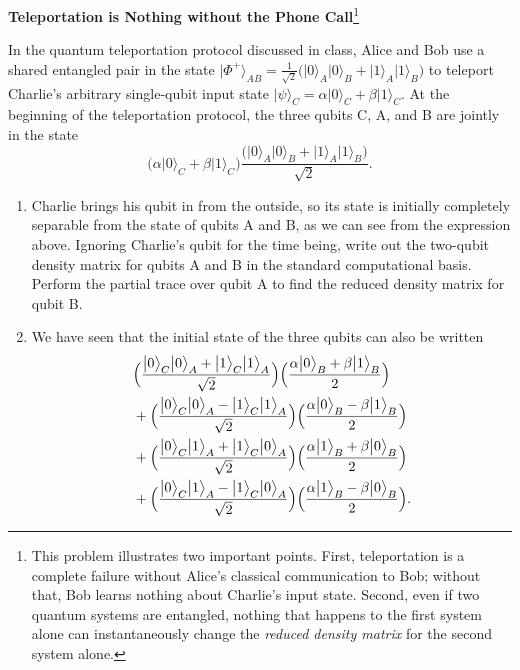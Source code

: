 \documentclass[10pt,letterpaper,boxed,cm]{hmcpset}
\newcommand{\ket}[1]{\big\lvert #1\big\rangle}
\begin{document}

\begin{problem}[1.]
    \textbf{Teleportation is Nothing without the Phone Call}\footnote{This problem illustrates two important points.  First, teleportation is a complete failure without Alice's classical communication to Bob; without that, Bob learns nothing about Charlie's input state.  Second, even if two quantum systems are entangled, nothing that happens to the first system alone can instantaneously change the \textit{reduced density matrix} for the second system alone.}

    In the quantum teleportation protocol discussed in class, Alice and Bob use a shared entangled pair in the state $\ket{\Phi^+}_{AB} = \frac{1}{\sqrt{2}}\bigl(\ket{0}_A\ket{0}_B + \ket{1}_A\ket{1}_B\bigr)$ to teleport Charlie's arbitrary single-qubit input state $\ket{\psi}_C = \alpha\ket{0}_C + \beta\ket{1}_C$.  At the beginning of the teleportation protocol, the three qubits C, A, and B are jointly in the state
    \[
        \bigl(\alpha\ket{0}_C+\beta\ket{1}_C\bigr)\frac{\bigl(\ket{0}_A\ket{0}_B+\ket{1}_A\ket{1}_B\bigr)}{\sqrt{2}}.
    \]
    \begin{enumerate}[label=(\alph*)]
        \item Charlie brings his qubit in from the outside, so its state is initially completely separable from the state of qubits A and B, as we can see from the expression above.  Ignoring Charlie's qubit for the time being, write out the two-qubit density matrix for qubits A and B in the standard computational basis.  Perform the partial trace over qubit A to find the reduced density matrix for qubit B.
        \item We have seen that the initial state of the three qubits can also be written
        \begin{align}
            &\Bigl(\frac{\ket{0}_C\ket{0}_A + \ket{1}_C\ket{1}_A}{\sqrt{2}}\Bigr) \Bigl(\frac{\alpha\ket{0}_B + \beta\ket{1}_B}{2}\Bigr) \nonumber \\
            &+ \Bigl(\frac{\ket{0}_C\ket{0}_A - \ket{1}_C\ket{1}_A}{\sqrt{2}}\Bigr) \Bigl(\frac{\alpha\ket{0}_B - \beta\ket{1}_B}{2}\Bigr) \nonumber \\
            &+ \Bigl(\frac{\ket{0}_C\ket{1}_A + \ket{1}_C\ket{0}_A}{\sqrt{2}}\Bigr) \Bigl(\frac{\alpha\ket{1}_B + \beta\ket{0}_B}{2}\Bigr) \nonumber \\
            &+ \Bigl(\frac{\ket{0}_C\ket{1}_A - \ket{1}_C\ket{0}_A}{\sqrt{2}}\Bigr) \Bigl(\frac{\alpha\ket{1}_B - \beta\ket{0}_B}{2}\Bigr). \nonumber

\end{align}
\end{enumerate}
\end{problem}
\end{document}
